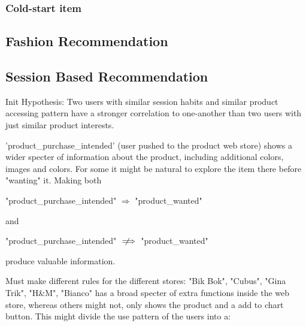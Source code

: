 \subsubsection{Cold-start item}






\subsection{Fashion Recommendation}



\subsection{Session Based Recommendation}
Init Hypothesis:
Two users with similar session habits and similar product accessing pattern have a stronger correlation to one-another than two users with just similar product interests.


'product\_purchase\_intended' (user pushed to the product web store) shows a wider specter of information about the product, including additional colors, images and colors.
For some it might be natural to explore the item there before "wanting" it. Making both

"product\_purchase\_intended" $\Rightarrow$ "product\_wanted"

and

"product\_purchase\_intended" $\notimplies$ "product\_wanted"

produce valuable information.

Must make different rules for the different stores:
"Bik Bok", "Cubus", "Gina Trik", "H\&M", "Bianco" has a broad specter of extra functions inside the web store, whereas others might not, only shows the product and a add to chart button.
This might divide the use pattern of the users into a:

